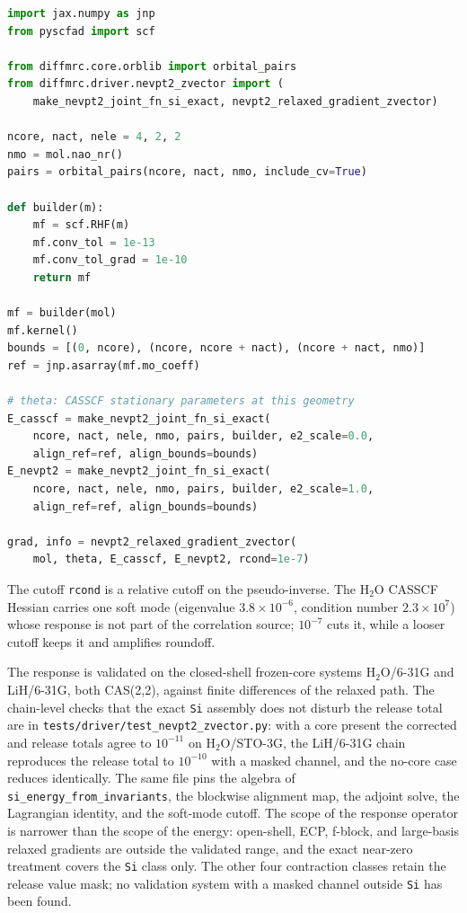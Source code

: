 \begin{lstlisting}[language=Python]
import jax.numpy as jnp
from pyscfad import scf

from diffmrc.core.orblib import orbital_pairs
from diffmrc.driver.nevpt2_zvector import (
    make_nevpt2_joint_fn_si_exact, nevpt2_relaxed_gradient_zvector)

ncore, nact, nele = 4, 2, 2
nmo = mol.nao_nr()
pairs = orbital_pairs(ncore, nact, nmo, include_cv=True)

def builder(m):
    mf = scf.RHF(m)
    mf.conv_tol = 1e-13
    mf.conv_tol_grad = 1e-10
    return mf

mf = builder(mol)
mf.kernel()
bounds = [(0, ncore), (ncore, ncore + nact), (ncore + nact, nmo)]
ref = jnp.asarray(mf.mo_coeff)

# theta: CASSCF stationary parameters at this geometry
E_casscf = make_nevpt2_joint_fn_si_exact(
    ncore, nact, nele, nmo, pairs, builder, e2_scale=0.0,
    align_ref=ref, align_bounds=bounds)
E_nevpt2 = make_nevpt2_joint_fn_si_exact(
    ncore, nact, nele, nmo, pairs, builder, e2_scale=1.0,
    align_ref=ref, align_bounds=bounds)

grad, info = nevpt2_relaxed_gradient_zvector(
    mol, theta, E_casscf, E_nevpt2, rcond=1e-7)
\end{lstlisting}

The cutoff \texttt{rcond} is a relative cutoff on the pseudo-inverse.
The H$_2$O CASSCF Hessian carries one soft mode (eigenvalue
$3.8\times10^{-6}$, condition number $2.3\times10^{7}$) whose response
is not part of the correlation source; $10^{-7}$ cuts it, while a looser
cutoff keeps it and amplifies roundoff.

The response is validated on the closed-shell frozen-core systems
H$_2$O/6-31G and LiH/6-31G, both CAS(2,2), against finite differences
of the relaxed path.  The chain-level checks that the exact
\texttt{Si} assembly does not disturb the release total are in
\texttt{tests/driver/test\_nevpt2\_zvector.py}: with a core present the
corrected and release totals agree to $10^{-11}$ on H$_2$O/STO-3G, the
LiH/6-31G chain reproduces the release total to $10^{-10}$ with a
masked channel, and the no-core case reduces identically.  The same
file pins the algebra of \texttt{si\_energy\_from\_invariants}, the
blockwise alignment map, the adjoint solve, the Lagrangian identity,
and the soft-mode cutoff.  The scope of the response operator is
narrower than the scope of the energy: open-shell, ECP, f-block, and
large-basis relaxed gradients are outside the validated range, and the
exact near-zero treatment covers the \texttt{Si} class only.  The other
four contraction classes retain the release value mask; no validation
system with a masked channel outside \texttt{Si} has been found.


